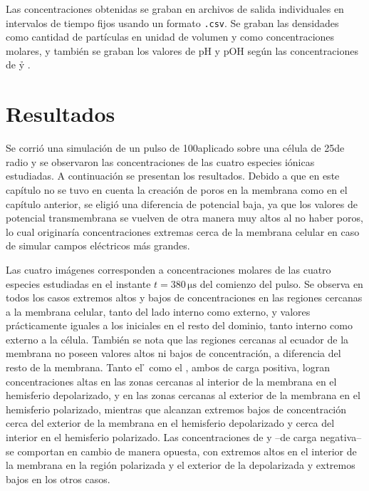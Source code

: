 Las concentraciones obtenidas se graban en archivos de salida individuales en intervalos de tiempo fijos usando un formato \texttt{.csv}. Se graban las densidades como cantidad de partículas en unidad de volumen y como concentraciones molares, y también se graban los valores de pH y pOH según las concentraciones de \h y \oh. 


\section{Resultados}

Se corrió una simulación de un pulso de 100\vcm aplicado sobre una célula de 25\um de radio y se observaron las concentraciones de las cuatro especies iónicas estudiadas. A continuación se presentan los resultados. Debido a que en este capítulo no se tuvo en cuenta la creación de poros en la membrana como en el capítulo anterior, se eligió una diferencia de potencial baja, ya que los valores de potencial transmembrana se vuelven de otra manera muy altos al no haber poros, lo cual originaría concentraciones extremas cerca de la membrana celular en caso de simular campos eléctricos más grandes.



Las cuatro imágenes corresponden a concentraciones molares de las cuatro especies estudiadas en el instante $t = 380 \, \si{\micro\second}$ del comienzo del pulso. Se observa en todos los casos extremos altos y bajos de concentraciones en las regiones cercanas a la membrana celular, tanto del lado interno como externo, y valores prácticamente iguales a los iniciales en el resto del dominio, tanto interno como externo a la célula. También se nota que las regiones cercanas al ecuador de la membrana no poseen valores altos ni bajos de concentración, a diferencia del resto de la membrana. Tanto el \h{} como el \na, ambos de carga positiva, logran concentraciones altas en las zonas cercanas al interior de la membrana en el hemisferio depolarizado, y en las zonas cercanas al exterior de la membrana en el hemisferio polarizado, mientras que alcanzan extremos bajos de concentración cerca del exterior de la membrana en el hemisferio depolarizado y cerca del interior en el hemisferio polarizado. Las concentraciones de \oh{} y \cl{} --de carga negativa-- se comportan en cambio de manera opuesta, con extremos altos en el interior de la membrana en la región polarizada y el exterior de la depolarizada y extremos bajos en los otros casos. \\

